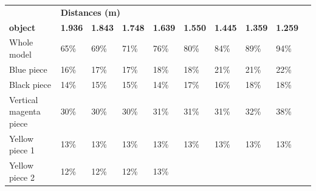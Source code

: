 \documentclass[a4paper, 12pt]{book}
\begin{document}
\begin{table}[H]
\centering
\setlength\tabcolsep{2pt}
\begin{tabular}{c|lllllllll}
\cline{1-9}
\multicolumn{1}{|l|}{}   & 
\multicolumn{8}{l|}{\textbf{\hspace{4.5cm} Distances (m)}}    \\
\cline{1-9}
\multicolumn{1}{|l|}{\textbf{object}}   & 
\multicolumn{1}{l|}{\textbf{1.936 }} & 
\multicolumn{1}{l|}{\textbf{1.843}} & 
\multicolumn{1}{l|}{\textbf{1.748}} &  
\multicolumn{1}{l|}{\textbf{1.639 }} & 
\multicolumn{1}{l|}{\textbf{1.550}} & 
\multicolumn{1}{l|}{\textbf{1.445}} & 
\multicolumn{1}{l|}{\textbf{1.359}} & 
\multicolumn{1}{l|}{\textbf{1.259}} & \\
\cline{1-9}
\multicolumn{1}{|l|}{Whole model}  & 
\multicolumn{1}{l|}{65\%}  &  
\multicolumn{1}{l|}{69\%}  & 
\multicolumn{1}{l|}{71\%}  & 
\multicolumn{1}{l|}{76\%}  & 
\multicolumn{1}{l|}{80\%}  & 
\multicolumn{1}{l|}{84\%}  & 
\multicolumn{1}{l|}{89\%}  & 
\multicolumn{1}{l|}{94\%}  &  \\ 
\cline{1-9}
\multicolumn{1}{|l|}{Blue piece}  &
\multicolumn{1}{l|}{16\%}  &
\multicolumn{1}{l|}{17\%}  & 
\multicolumn{1}{l|}{17\%} & 
\multicolumn{1}{l|}{18\%}  & 
\multicolumn{1}{l|}{18\%}  &  
\multicolumn{1}{l|}{21\%}  & 
\multicolumn{1}{l|}{21\%}  &
\multicolumn{1}{l|}{22\%}   &  \\ 
\cline{1-9}
\multicolumn{1}{|l|}{Black piece}  & 
\multicolumn{1}{l|}{14\%}  & 
\multicolumn{1}{l|}{15\%}  & 
\multicolumn{1}{l|}{15\%} & 
\multicolumn{1}{l|}{14\%}  & 
\multicolumn{1}{l|}{17\%}  &
\multicolumn{1}{l|}{16\%}  & 
\multicolumn{1}{l|}{18\%}  & 
\multicolumn{1}{l|}{18\%}  &  \\ 
\cline{1-9}
\multicolumn{1}{|l|}{Vertical magenta piece}  & 
\multicolumn{1}{l|}{30\%}  & 
\multicolumn{1}{l|}{30\%}  & 
\multicolumn{1}{l|}{30\%} & 
\multicolumn{1}{l|}{31\%}  & 
\multicolumn{1}{l|}{31\%}  & 
\multicolumn{1}{l|}{31\%}  & 
\multicolumn{1}{l|}{32\%}  &  
\multicolumn{1}{l|}{38\%}  & \\ 
\cline{1-9}
\multicolumn{1}{|l|}{Yellow piece 1}  & 
\multicolumn{1}{l|}{13\%}  & 
\multicolumn{1}{l|}{13\%}  & 
\multicolumn{1}{l|}{13\%}  & 
\multicolumn{1}{l|}{13\%}  & 
\multicolumn{1}{l|}{13\%}  & 
\multicolumn{1}{l|}{13\%}  & 
\multicolumn{1}{l|}{13\%}  & 
\multicolumn{1}{l|}{13\%}  & \\ 
\cline{1-9}
\multicolumn{1}{|l|}{Yellow piece 2}  & 
\multicolumn{1}{l|}{12\%}  & 
\multicolumn{1}{l|}{12\%}  & 
\multicolumn{1}{l|}{12\%}  &  
\multicolumn{1}{l|}{13\%}  & 

\end{tabular}
\end{table}
\end{document}
